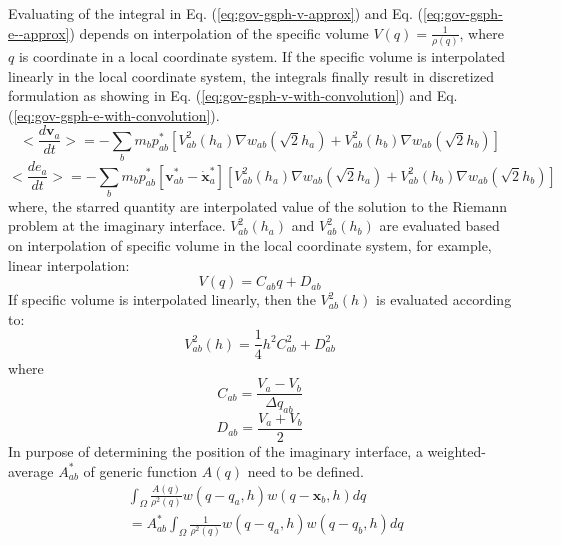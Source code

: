 Evaluating of the integral in Eq. (\ref{eq:gov-gsph-v-approx}) and Eq. (\ref{eq:gov-gsph-e--approx}) depends on interpolation of the specific volume $V(q) = \frac{1}{\rho(q)}$, where $q$ is coordinate in a local coordinate system. If the specific volume is interpolated linearly in the local coordinate system, the integrals finally result in discretized formulation as showing in Eq. (\ref{eq:gov-gsph-v-with-convolution}) and Eq. (\ref{eq:gov-gsph-e-with-convolution}).
\begin{equation}
<\dfrac{d \textbf{v}_{a}}{dt}>= -\sum_{b} m_{b} p_{a b}^{\ast} \left[ V_{ab}^2(h_a) \nabla w_{a b}(\sqrt{2} h_{a}) + V_{ab}^2(h_b) \nabla w_{a b}(\sqrt{2} h_{b}) \right]
\label{eq:gov-gsph-v-with-convolution}
\end{equation}
\begin{equation}
<\dfrac{d e_{a}}{dt}>= - \sum_{b} m_{b} p_{a b}^{\ast} [\textbf{v}_{a b}^{\ast} - \dot{\textbf{x}}_{a}^{\ast}] \left[V_{ab}^2(h_a) \nabla w_{a b}(\sqrt{2} h_{a}) + V_{ab}^2(h_b) \nabla w_{a b}(\sqrt{2} h_{b}) \right]
\label{eq:gov-gsph-e-with-convolution}
\end{equation}
where, the starred quantity are interpolated value of the solution to the Riemann problem at the imaginary interface.
$V_{ab}^2(h_a)$ and $V_{ab}^2(h_b)$ are evaluated based on interpolation of specific volume in the local coordinate system, for example, linear interpolation: 
\begin{equation}
V(q) = C_{ab}q+D_{ab}
\label{eq:gsph-V-linear-interplation}
\end{equation}
If specific volume is interpolated linearly, then the $V^2_{ab}(h)$ is evaluated according to:
\begin{equation}
V^2_{ab}(h) = \frac{1}{4}h^2C_{ab}^2+D_{ab}^2
\label{eq:gsph-V-linear-interplation-sq}
\end{equation}
where
\begin{equation}
C_{ab} = \frac{V_a-V_b}{\Delta q_{ab}}
\label{eq:gsph-V-linear-interplation-C}
\end{equation}
\begin{equation}
D_{ab} = \frac{V_a+V_b}{2}
\label{eq:gsph-V-linear-interplation-D}
\end{equation}
In purpose of determining the position of the imaginary interface, a weighted-average $A_{ab}^{\ast}$ of generic function $A(q)$ need to be defined.
\begin{equation}
\begin{split}
& \int_{\Omega} \frac{A\left(q \right)}{\rho^2(q)} w\left(q -q_a, h\right) w(q - \textbf{x}_{b}, h) dq \\
& =A_{ab}^{\ast} \int_{\Omega} \frac{1}{\rho^2(q)} w\left(q -q_a, h\right) w(q - q_{b}, h) dq
\end{split}
\label{eq:GSPH-f-interpolation-def}
\end{equation}
